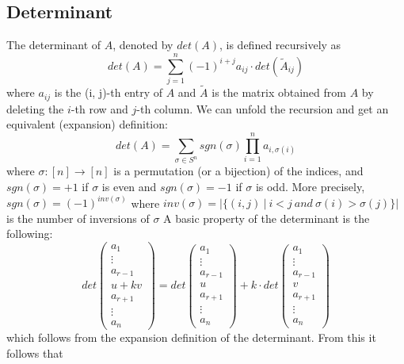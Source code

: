 \documentclass[11pt,a4paper]{report}
\theoremstyle{theoremdd}
\theoremstyle{claims1}
\theoremstyle{proofs1}
\begin{document}
\subsection{Determinant}
The determinant of $A$, denoted by $det(A)$, is defined recursively as $$det(A)=\sum_{j=1}^{n}(-1)^{i+j}a_{ij}\cdot  det(\tilde{A}_{ij})$$
\indent where $a_{ij}$ is the (i, j)-th entry of $A$ and $\tilde{A}$ is the matrix obtained from $A$ by deleting the $i$-th row and $j$-th column.
\newline We can unfold the recursion and get an equivalent (expansion) definition:
$$ det(A)=\sum_{\sigma\in S^n}^{} sgn(\sigma) \prod_{i=1}^{n}a_{i,\sigma(i)}$$
\indent where $\sigma :[n]\rightarrow [n]$ is a permutation (or a bijection) of the indices, and $sgn(\sigma)=+1$ if $\sigma$ is even and $sgn(\sigma)=-1$ if $\sigma$ is odd. More precisely, $sgn(\sigma)=(-1)^{inv(\sigma)}$ where $ inv(\sigma)=\vert \{(i,j) \ \vert \ i < j \ and \ \sigma (i) > \sigma (j) \} \vert $ is the number of inversions of $\sigma$
\newline\newline A basic property of the determinant is the following:
\[ det\begin{pmatrix}
a_1 \\ \vdots \\ a_{r-1} \\ u+kv \\ a_{r+1} \\ \vdots \\ a_n
\end{pmatrix}
= 
det\begin{pmatrix}
a_1 \\ \vdots \\ a_{r-1} \\ u \\ a_{r+1} \\ \vdots \\ a_n
\end{pmatrix}
+
k\cdot det \begin{pmatrix}
a_1 \\ \vdots \\ a_{r-1} \\ v \\ a_{r+1} \\ \vdots \\ a_n
\end{pmatrix}
\] which follows from the expansion definition of the determinant.
\newline From this it follows that 
\end{document}

